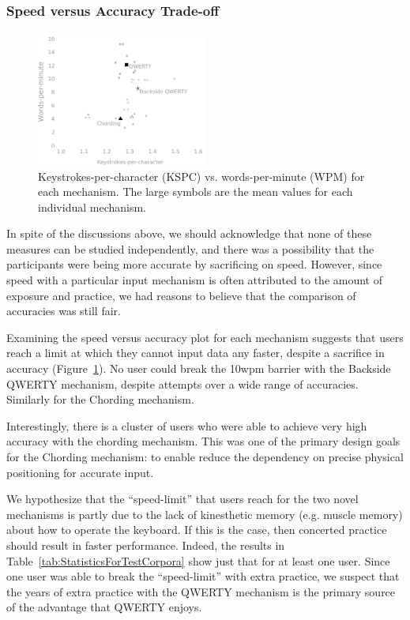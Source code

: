 \subsubsection{Speed versus Accuracy Trade-off}

\begin{figure}
    \includegraphics[width=0.5\textwidth]{Figures/kspc_vs_wpm.pdf} 
    \caption{Keystrokes-per-character (KSPC) vs. words-per-minute
      (WPM) for each mechanism.  The large symbols are the mean values
      for each individual mechanism. }
    \label{fig:kspc_vs_wpm}
\end{figure}

In spite of the discussions above, we should acknowledge that none of
these measures can be studied independently, and there was a
possibility that the participants were being more accurate by
sacrificing on speed. However, since speed with a particular input
mechanism is often attributed to the amount of exposure and practice,
we had reasons to believe that the comparison of accuracies was still
fair. 

Examining the speed versus accuracy plot for each mechanism suggests
that users reach a limit at which they cannot input data any faster,
despite a sacrifice in accuracy (Figure~\ref{fig:kspc_vs_wpm}).  No
user could break the 10wpm barrier with the Backside QWERTY mechanism,
despite attempts over a wide range of accuracies.  Similarly for the
Chording mechanism.

Interestingly, there is a cluster of users who were able to achieve
very high accuracy with the chording mechanism.  This was one of the
primary design goals for the Chording mechanism: to enable reduce the
dependency on precise physical positioning for accurate input.

We hypothesize that the ``speed-limit'' that users reach for the two
novel mechanisms is partly due to the lack of kinesthetic memory
(e.g. muscle memory) about how to operate the keyboard.  If this is
the case, then concerted practice should result in faster performance.
Indeed, the results in Table~\ref{tab:StatisticsForTestCorpora} show
just that for at least one user.  Since one user was able to break the
``speed-limit'' with extra practice, we suspect that the years of
extra practice with the QWERTY mechanism is the primary source of the
advantage that QWERTY enjoys.

